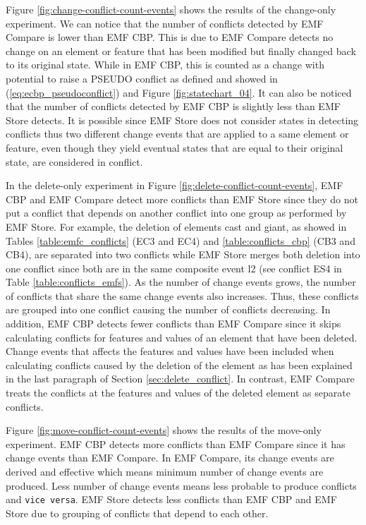 Figure \ref{fig:change-conflict-count-events} shows the results of the change-only experiment. We can notice that the number of conflicts detected by EMF Compare is lower than EMF CBP. This is due to EMF Compare detects no change on an element or feature that has been modified but finally changed back to its original state. While in EMF CBP, this is counted as a change with potential to raise a {PSEUDO} conflict as defined and showed in (\ref{eq:ecbp_pseudoconflict}) and Figure \ref{fig:statechart_04}. It can also be noticed that the number of conflicts detected by EMF CBP is slightly less than EMF Store detects. It is possible since EMF Store does not consider states in detecting conflicts thus two different change events that are applied to a same element or feature, even though they yield eventual states that are equal to their original state, are considered in conflict.

In the delete-only experiment in Figure \ref{fig:delete-conflict-count-events}, EMF CBP and EMF Compare detect more conflicts than EMF Store since they do not put a conflict that depends on another conflict into one group as performed by EMF Store. For example, the deletion of elements \textsf{cast} and \textsf{giant}, as showed in Tables \ref{table:emfc_conflicts} (EC3 and EC4) and \ref{table:conflicts_cbp} (CB3 and CB4), are separated into two conflicts while EMF Store merges both deletion into one conflict since both are in the same composite event \textsf{l2} (see conflict ES4 in Table \ref{table:conflicts_emfs}). As the number of change events grows, the number of conflicts that share the same change events also increases. Thus, these conflicts are grouped into one conflict causing the number of conflicts decreasing. In addition, EMF CBP detects fewer conflicts than EMF Compare since it skips calculating conflicts for features and values of an element that have been deleted. Change events that affects the features and values have been included when calculating conflicts caused by the deletion of the element as has been explained in the last paragraph of Section \ref{sec:delete_conflict}. In contrast, EMF Compare treats the conflicts at the features and values of the deleted element as separate conflicts. 

Figure \ref{fig:move-conflict-count-events} shows the results of the move-only experiment. EMF CBP detects more conflicts than EMF Compare since it has change events than EMF Compare. In EMF Compare, its change events are derived and effective which means minimum number of change events are produced. Less number of change events means less probable to produce conflicts and \texttt{vice versa}. EMF Store detects less conflicts than EMF CBP and EMF Store due to grouping of conflicts that depend to each other. 

